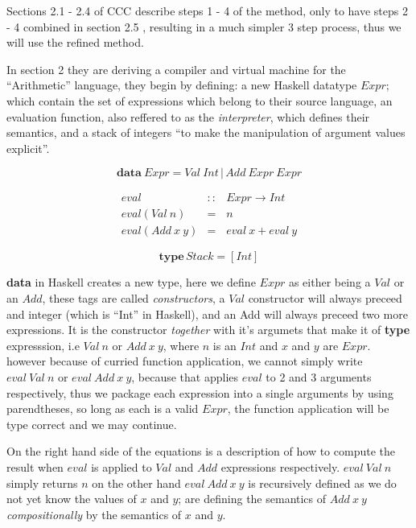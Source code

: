 \documentclass {article}
\begin{document}
Sections 2.1 - 2.4 of CCC describe steps
1 - 4 of the method, only to have steps 2 - 4 combined
in section 2.5 \cite[2.5 Combining the transformation steps]{bandh},
 resulting in a much simpler 3 step process, thus we will use the refined method.

In section 2 they are deriving a compiler
and virtual machine for the ``Arithmetic'' language,
they begin by defining: a new Haskell datatype $Expr$;
which contain the set of expressions which belong to their source language,
an evaluation function, also reffered to as the \emph{interpreter},
which defines their semantics,
and a stack of integers 
``to make the manipulation of argument values explicit''.

	\[ \textbf{data} \  Expr = Val \ Int \, | \, Add \ Expr \ Expr\]

\newcommand{\eval}{$eval$}

\begin{eqnarray*}
	 eval &::& Expr \rightarrow Int \\ 
	 eval (Val \  n) &=& n \\
	 eval (Add \  x \  y) &=& eval \  x + eval \  y 
\end{eqnarray*}

	\[ \textbf{type} \, Stack = [Int]\]

\textbf{data} in Haskell creates a new type,
here we define $Expr$ as either being a $Val$
or an $Add$, these tags are called \emph{constructors},
a $Val$ constructor will always preceed and integer
(which is ``Int'' in Haskell),
and an Add will always preceed two more expressions.
It is the constructor \emph{together} with 
it's argumets that make it of \textbf{type}
expresssion, i.e $Val \ n$ or $Add \ x \ y$,
where $n$ is an $Int$ and $x$ and $y$ are $Expr$.
however because of curried function application,
we cannot simply write 
$eval \ Val \ n$ or $eval \ Add \ x \ y$,
because that applies $eval$ to 2 and 3 arguments respectively,
thus we package each expression into a single arguments
by using parendtheses, so long as each is a
valid $Expr$, the function application will be type correct
and we may continue.

On the right hand side of the equations is a
description of how to compute 
the result when $eval$ is applied to $Val$ and
$Add$ expressions respectively.
$eval \ Val \ n$ simply returns $n$
on the other hand $eval \ Add \ x \ y$
is recursively defined as we do not yet know
the values of $x$ and $y$; \BH are defining the
semantics of $Add \ x \ y$ \emph{compositionally} by the 
semantics of $x$ and $y$.
\end{document}
